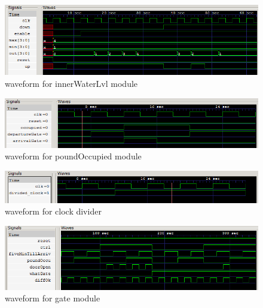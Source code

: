 \documentclass{article}
\begin{document}
      \begin{figure} [H]
        \centering
        \includegraphics[width=0.75\linewidth]{figures/gtkwave/innerwatrlvl_gtk.png}
        \caption{waveform for innerWaterLvl module}
        \label{fig:innerWaterLvl_waveform}
      \end{figure}

      \begin{figure} [H]
        \centering
        \includegraphics[width=0.75\linewidth]{figures/gtkwave/poundOccu_gtk.png}
        \caption{waveform for poundOccupied module}
        \label{fig:poundOccupied_waveform}
      \end{figure}

      \begin{figure} [H]
        \centering
        \includegraphics[width=0.75\linewidth]{figures/gtkwave/clkdiv_gtk.png}
        \caption{waveform for clock divider}
        \label{fig:clock_divider_waveform}
      \end{figure}

      \begin{figure} [H]
        \centering
        \includegraphics[width=0.75\linewidth]{figures/gtkwave/gate_gtk.png}
        \caption{waveform for gate module}
        \label{fig:gate_waveform}
      \end{figure}
\end{document}
